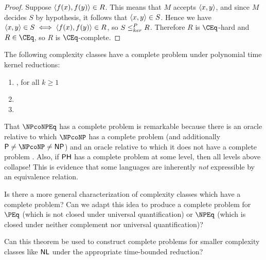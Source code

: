 \begin{proof}
  Suppose $\langle f(x),f(y)\rangle\in R$.
  This means that $M$ accepts $\langle x,y\rangle$, and since $M$ decides $S$ by hypothesis, it follows that $\langle x,y\rangle\in S$.
  Hence we have $\langle x,y\rangle\in S\iff \langle f(x),f(y)\rangle\in R$, so $S\leq^{P}_{ker} R$.
  Therefore $R$ is $\CEq$-hard and $R\in\CEq$, so $R$ is $\CEq$-complete.
\end{proof}

\begin{corollary}\label{cor:completeproblem}
  The following complexity classes have a complete problem under polynomial time kernel reductions:
  \begin{enumerate}
  \item \SKPEq, for all $k\geq 1$
  \item \PSPACEEq
  \item \PHEq
  \end{enumerate}
\end{corollary}

\begin{remark}
  That $\NPcoNPEq$ has a complete problem is remarkable because there is an oracle relative to which $\NPcoNP$ has a complete problem (and additionally $\P\neq\NPcoNP\neq\NP$) \cite{hi} and an oracle relative to which it does not have a complete problem \cite{sipser}.
  Also, if ${\mathsf{PH}}$ has a complete problem at some level, then all levels above collapse!
  This is evidence that some languages are inherently \emph{not} expressible by an equivalence relation.
\end{remark}

\begin{openproblem}
  Is there a more general characterization of complexity classes which have a complete problem?
  Can we adapt this idea to produce a complete problem for $\PEq$ (which is not closed under universal quantification) or $\NPEq$ (which is closed under neither complement nor universal quantification)?
\end{openproblem}

\begin{openproblem}
  Can this theorem be used to construct complete problems for smaller complexity classes like ${\mathsf{NL}}$ under the appropriate time-bounded reduction?
\end{openproblem}
